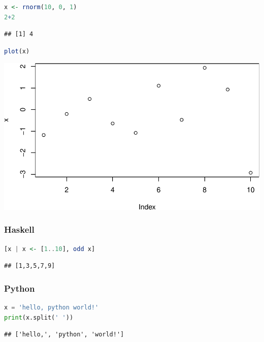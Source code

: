 \documentclass[final,12pt,]{CSUNthesis}
\begin{document}
\begin{lstlisting}[language=
R
]
x <- rnorm(10, 0, 1)
2+2
\end{lstlisting}

\begin{verbatim}
## [1] 4
\end{verbatim}

\begin{lstlisting}[language=
R
]
plot(x)
\end{lstlisting}

\includegraphics{skeleton_files/figure-latex/unnamed-chunk-1-1.pdf}

\subsubsection{Haskell}\label{haskell}

\begin{lstlisting}[language=
haskell
]
[x | x <- [1..10], odd x]
\end{lstlisting}

\begin{verbatim}
## [1,3,5,7,9]
\end{verbatim}

\subsubsection{Python}\label{python}

\begin{lstlisting}[language=
python
]
x = 'hello, python world!'
print(x.split(' '))
\end{lstlisting}

\begin{verbatim}
## ['hello,', 'python', 'world!']
\end{verbatim}
\end{document}
